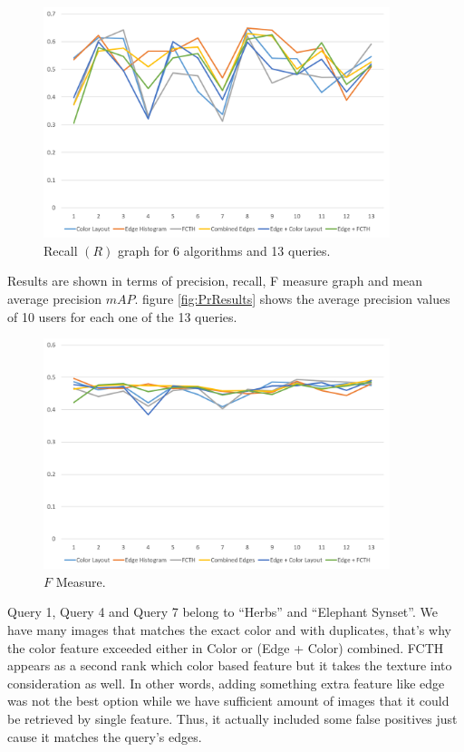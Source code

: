 \documentclass[11pt]{article}
\begin{document}
\begin{figure}[h]
\centering
\includegraphics[width=0.9\textwidth]{ResultsRecall}
\caption{ Recall $(R)$ graph for 6 algorithms and 13 queries.}
\label{fig:ResultsRecall}
\end{figure}

Results are shown in terms of precision, recall, F measure graph and mean average precision $mAP$. figure \ref{fig:PrResults} shows the average precision values of 10 users for each one of the 13 queries.

\begin{figure}[h]
\centering
\includegraphics[width=0.9\textwidth]{ResultsF}
\caption{ $F$ Measure.}
\label{fig:ResultsF}
\end{figure}

Query 1, Query 4 and Query 7 belong to “Herbs” and “Elephant Synset”. We have many images that matches the exact color and with duplicates, that’s why the color feature exceeded either in Color or (Edge + Color) combined. FCTH appears as a second rank which color based feature but it takes the texture into consideration as well. In other words, adding something extra feature like edge was not the best option while we have sufficient amount of images that it could be retrieved by single feature. Thus, it actually included some false positives just cause it matches the query's edges.
\end{document}
